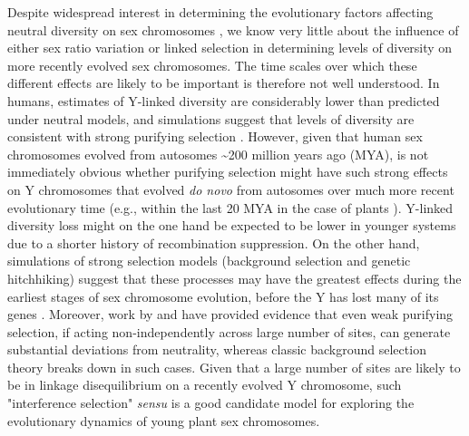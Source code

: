 \documentclass[9pt,twocolumn,twoside]{gsajnl}
\begin{document}
Despite widespread interest in determining the evolutionary factors affecting neutral diversity on sex chromosomes \citep{ellegren2011,bachtrog2013NRG}, we know very little about the influence of either sex ratio variation or linked selection in determining levels of diversity on more recently evolved sex chromosomes. The time scales over which these different effects are likely to be important is therefore not well understood. In humans, estimates of Y-linked diversity are considerably lower than predicted under neutral models, and simulations suggest that levels of diversity are consistent with strong purifying selection \citep{Wilsonsayres2014}. However, given that human sex chromosomes evolved from autosomes \textasciitilde 200 million years ago (MYA), is not immediately obvious whether purifying selection might have such strong effects on Y chromosomes that evolved \textit{do novo} from autosomes over much more recent evolutionary time (e.g., within the last 20 MYA in the case of plants \citep{charlesworth2015plant}). Y-linked diversity loss might on the one hand be expected to be lower in younger systems due to a shorter history of recombination suppression. On the other hand, simulations of strong selection models (background selection and genetic hitchhiking) suggest that these processes may have the greatest effects during the earliest stages of sex chromosome evolution, before the Y has lost many of its genes \citep{bachtrog2008temporal}. Moreover, work by \citep{KaiserCharlesworth} and \citep{good2014genetic} have provided evidence that even weak purifying selection, if acting non-independently across large number of sites, can generate substantial deviations from neutrality, whereas classic background selection theory breaks down in such cases. Given that a large number of sites are likely to be in linkage disequilibrium on a recently evolved Y chromosome, such "interference selection" \textit{sensu} \citep{good2014genetic} is a good candidate model for exploring the evolutionary dynamics of young plant sex chromosomes.
\end{document}
